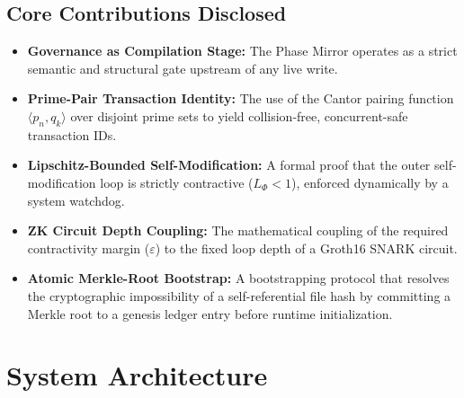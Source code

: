 \documentclass[11pt]{article}
\begin{document}
\section{Core Contributions Disclosed}
\begin{itemize}
    \item \textbf{Governance as Compilation Stage:} The Phase Mirror operates as a strict semantic and structural gate upstream of any live write.
    \item \textbf{Prime-Pair Transaction Identity:} The use of the Cantor pairing function \(\langle p_n, q_k \rangle\) over disjoint prime sets to yield collision-free, concurrent-safe transaction IDs.
    \item \textbf{Lipschitz-Bounded Self-Modification:} A formal proof that the outer self-modification loop is strictly contractive (\(L_\Phi < 1\)), enforced dynamically by a system watchdog.
    \item \textbf{ZK Circuit Depth Coupling:} The mathematical coupling of the required contractivity margin (\(\varepsilon\)) to the fixed loop depth of a Groth16 SNARK circuit.
    \item \textbf{Atomic Merkle-Root Bootstrap:} A bootstrapping protocol that resolves the cryptographic impossibility of a self-referential file hash by committing a Merkle root to a genesis ledger entry before runtime initialization.
\end{itemize}

\chapter{System Architecture}
\end{document}
